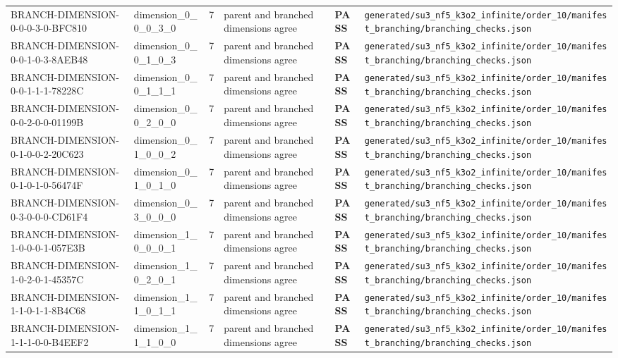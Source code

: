 \documentclass[11pt]{article}
\newcommand{\Pass}{\textcolor{green!50!black}{\textbf{PASS}}}
\newcommand{\RawPath}[1]{\texttt{#1}}
\begin{document}
\begin{longtable}{p{3cm}p{2.5cm}r p{3cm}l p{2cm}}
BRANCH-DIMENSION-0-0-0-3-0-BFC810 & dimension\_0\_0\_0\_3\_0 & 7 & parent and branched dimensions agree & \Pass & \RawPath{generated/su3\_nf5\_k3o2\_infinite/order\_10/manifest\_branching/branching\_checks.json}\\
BRANCH-DIMENSION-0-0-1-0-3-8AEB48 & dimension\_0\_0\_1\_0\_3 & 7 & parent and branched dimensions agree & \Pass & \RawPath{generated/su3\_nf5\_k3o2\_infinite/order\_10/manifest\_branching/branching\_checks.json}\\
BRANCH-DIMENSION-0-0-1-1-1-78228C & dimension\_0\_0\_1\_1\_1 & 7 & parent and branched dimensions agree & \Pass & \RawPath{generated/su3\_nf5\_k3o2\_infinite/order\_10/manifest\_branching/branching\_checks.json}\\
BRANCH-DIMENSION-0-0-2-0-0-01199B & dimension\_0\_0\_2\_0\_0 & 7 & parent and branched dimensions agree & \Pass & \RawPath{generated/su3\_nf5\_k3o2\_infinite/order\_10/manifest\_branching/branching\_checks.json}\\
BRANCH-DIMENSION-0-1-0-0-2-20C623 & dimension\_0\_1\_0\_0\_2 & 7 & parent and branched dimensions agree & \Pass & \RawPath{generated/su3\_nf5\_k3o2\_infinite/order\_10/manifest\_branching/branching\_checks.json}\\
BRANCH-DIMENSION-0-1-0-1-0-56474F & dimension\_0\_1\_0\_1\_0 & 7 & parent and branched dimensions agree & \Pass & \RawPath{generated/su3\_nf5\_k3o2\_infinite/order\_10/manifest\_branching/branching\_checks.json}\\
BRANCH-DIMENSION-0-3-0-0-0-CD61F4 & dimension\_0\_3\_0\_0\_0 & 7 & parent and branched dimensions agree & \Pass & \RawPath{generated/su3\_nf5\_k3o2\_infinite/order\_10/manifest\_branching/branching\_checks.json}\\
BRANCH-DIMENSION-1-0-0-0-1-057E3B & dimension\_1\_0\_0\_0\_1 & 7 & parent and branched dimensions agree & \Pass & \RawPath{generated/su3\_nf5\_k3o2\_infinite/order\_10/manifest\_branching/branching\_checks.json}\\
BRANCH-DIMENSION-1-0-2-0-1-45357C & dimension\_1\_0\_2\_0\_1 & 7 & parent and branched dimensions agree & \Pass & \RawPath{generated/su3\_nf5\_k3o2\_infinite/order\_10/manifest\_branching/branching\_checks.json}\\
BRANCH-DIMENSION-1-1-0-1-1-8B4C68 & dimension\_1\_1\_0\_1\_1 & 7 & parent and branched dimensions agree & \Pass & \RawPath{generated/su3\_nf5\_k3o2\_infinite/order\_10/manifest\_branching/branching\_checks.json}\\
BRANCH-DIMENSION-1-1-1-0-0-B4EEF2 & dimension\_1\_1\_1\_0\_0 & 7 & parent and branched dimensions agree & \Pass & \RawPath{generated/su3\_nf5\_k3o2\_infinite/order\_10/manifest\_branching/branching\_checks.json}\\

\end{longtable}
\end{document}
